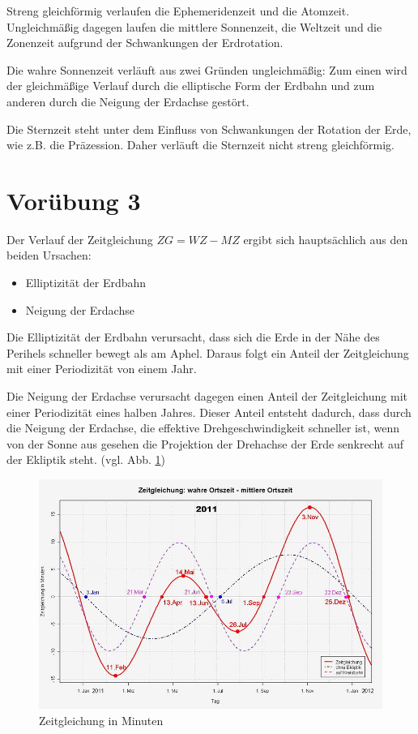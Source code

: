 \documentclass[titlepage]{scrartcl}
\begin{document}
Streng gleichförmig verlaufen die Ephemeridenzeit und die Atomzeit.
Ungleichmäßig dagegen laufen die mittlere Sonnenzeit, die Weltzeit und die Zonenzeit aufgrund der Schwankungen der Erdrotation.

Die wahre Sonnenzeit verläuft aus zwei Gründen ungleichmäßig: Zum einen wird der gleichmäßige Verlauf durch die elliptische Form der Erdbahn und zum anderen durch die Neigung der Erdachse gestört.

Die Sternzeit steht unter dem Einfluss von Schwankungen der Rotation der Erde, wie z.B. die Präzession. Daher verläuft die Sternzeit nicht streng gleichförmig.

\section{Vorübung 3}

Der Verlauf der Zeitgleichung $ ZG=WZ-MZ $ ergibt sich hauptsächlich aus den beiden Ursachen:

\begin{itemize}
\item Elliptizität der Erdbahn
\item Neigung der Erdachse
\end{itemize}
Die Elliptizität der Erdbahn verursacht, dass sich die Erde in der Nähe des Perihels schneller bewegt als am Aphel. Daraus folgt ein Anteil der Zeitgleichung mit einer Periodizität von einem Jahr.

Die Neigung der Erdachse verursacht dagegen einen Anteil der Zeitgleichung mit einer Periodizität eines halben Jahres. Dieser Anteil entsteht dadurch, dass durch die Neigung der Erdachse, die effektive Drehgeschwindigkeit schneller ist, wenn von der Sonne aus gesehen die Projektion der Drehachse der Erde senkrecht auf der Ekliptik steht. (vgl. Abb. \ref{fig:Zeitgleichung})

\begin{figure}
        \includegraphics[width=.9\textwidth]{images/Zeitgleichung}
\caption{ Zeitgleichung in Minuten }
\label{fig:Zeitgleichung}
\end{figure}
\end{document}
